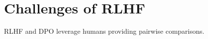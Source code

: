 \section{Challenges of RLHF}

RLHF and DPO leverage humans providing pairwise comparisons. 

\begin{enumerate}[(a)]

	

    

    

\end{enumerate}